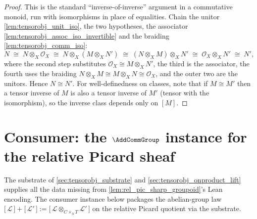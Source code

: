 \begin{proof}
  \leanok
  This is the standard ``inverse-of-inverse'' argument in a commutative monoid, run
  with isomorphisms in place of equalities. Chain the unitor
  \cref{lem:tensorobj_unit_iso}, the two hypotheses, the associator
  \cref{lem:tensorobj_assoc_iso_invertible} and the braiding
  \cref{lem:tensorobj_comm_iso}:
  \[
    N
    \;\cong\; N \otimes_X \mathcal{O}_X
    \;\cong\; N \otimes_X (M \otimes_X N')
    \;\cong\; (N \otimes_X M) \otimes_X N'
    \;\cong\; \mathcal{O}_X \otimes_X N'
    \;\cong\; N',
  \]
  where the second step substitutes \(\mathcal{O}_X \cong M \otimes_X N'\), the
  third is the associator, the fourth uses the braiding
  \(N \otimes_X M \cong M \otimes_X N \cong \mathcal{O}_X\), and the outer two are
  the unitors. Hence \(N \cong N'\). For well-definedness on classes, note that if
  \(M \cong M'\) then a tensor inverse of \(M\) is also a tensor inverse of \(M'\)
  (tensor with the isomorphism), so the inverse class depends only on \([M]\).
\end{proof}

\section{Consumer: the \(\AddCommGroup\) instance for the relative Picard sheaf}
\label{sec:tensorobj_consumer_acg}

The substrate of \cref{sec:tensorobj_substrate} and \cref{sec:tensorobj_onproduct_lift}
supplies all the data missing from \cref{lem:rel_pic_sharp_groupoid}'s Lean
encoding. The consumer instance below packages the abelian-group law
\(\bigl[\,\mathcal{L}\,\bigr] + \bigl[\,\mathcal{L}'\,\bigr]
 := \bigl[\,\mathcal{L} \otimes_{C \times_S T} \mathcal{L}'\,\bigr]\) on the
relative Picard quotient via the substrate.

